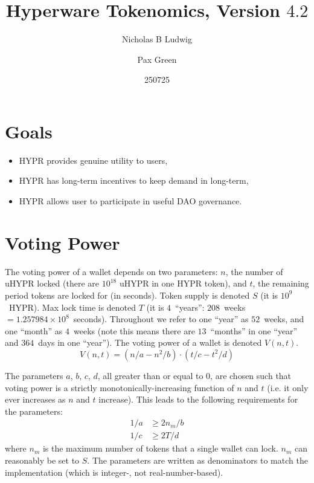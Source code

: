 \documentclass{article}
\title{Hyperware Tokenomics, Version $4.2$}
\date{250725}
\author{Nicholas B Ludwig \and Pax Green}
\begin{document}
\maketitle

\section{Goals}\label{sec:goals}
\begin{itemize}
    \item HYPR provides genuine utility to users,
    \item HYPR has long-term incentives to keep demand in long-term,
    \item HYPR allows user to participate in useful DAO governance.
\end{itemize}

\section{Voting Power}\label{sec:votingpower}

The voting power of a wallet depends on two parameters: $n$, the number of uHYPR locked (there are $10^{18}$ uHYPR in one HYPR token), and $t$, the remaining period tokens are locked for (in seconds).
Token supply is denoted $S$ (it is $10^9$~HYPR).
Max lock time is denoted $T$ (it is $4$~``years'': $208$~weeks $= 1.257984\times 10^8$~seconds).
Throughout we refer to one ``year'' as $52$~weeks, and one ``month'' as $4$~weeks (note this means there are $13$~``months'' in one ``year'' and $364$~days in one ``year'').
The voting power of a wallet is denoted $V(n, t)$.
\begin{equation}
V(n, t) = (n/a - n^2/b) \cdot (t/c - t^2/d)
\end{equation}

The parameters $a$, $b$, $c$, $d$, all greater than or equal to $0$, are chosen such that voting power is a strictly monotonically-increasing function of $n$ and $t$ (i.e. it only ever increases as $n$ and $t$ increase).
This leads to the following requirements for the parameters:
\begin{equation}\label{eq:parameters-extremum}
\begin{aligned}
1/a &\geq 2 n_m / b\\
1/c &\geq 2 T / d
\end{aligned}
\end{equation}
where $n_m$ is the maximum number of tokens that a single wallet can lock.
$n_m$ can reasonably be set to $S$.
The parameters are written as denominators to match the implementation (which is integer-, not real-number-based).
\end{document}

